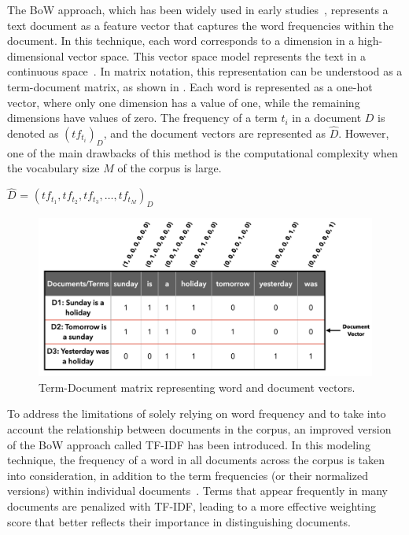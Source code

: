 The \ac{BoW} approach, which has been widely used in early studies~\cite{zhao2017fuzzy, qader2019overview}, represents a text document as a feature vector that captures the word frequencies within the document. In this technique, each word corresponds to a dimension in a high-dimensional vector space. This vector space model represents the text in a continuous space~\cite{afzali2019text}. In matrix notation, this representation can be understood as a term-document matrix, as shown in . Each word is represented as a one-hot vector, where only one dimension has a value of one, while the remaining dimensions have values of zero. The frequency of a term $t_i$ in a document $D$ is denoted as $(tf_{t_i})_D$, and the document vectors are represented as $\hat{D}$. However, one of the main drawbacks of this method is the computational complexity when the vocabulary size $M$ of the corpus is large.

\centerline{$\hat{D}$ = $(tf_{t_1}, tf_{t_2}, tf_{t_3},\dots, tf_{t_M})_D$ }

\begin{figure}[h]
	\centering
	\includegraphics[width=.9\textwidth]{images/thesis_images/term_document_matrix.png}
	\caption[Term-Document matrix example.]{Term-Document matrix representing word and document vectors. \label{fig:td_matrix}}
\end{figure}


To address the limitations of solely relying on word frequency and to take into account the relationship between documents in the corpus, an improved version of the \ac{BoW} approach called \ac{TF-IDF} has been introduced. In this modeling technique, the frequency of a word in all documents across the corpus is taken into consideration, in addition to the term frequencies (or their normalized versions) within individual documents~\cite{lavin2019analyzing}. Terms that appear frequently in many documents are penalized with \ac{TF-IDF}, leading to a more effective weighting score that better reflects their importance in distinguishing documents.

